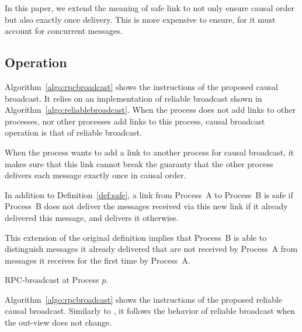 In this paper, we extend the meaning of safe link to not only ensure causal
order but also exactly once delivery. This is more expensive to ensure, for it
must account for concurrent messages. 



\subsection{Operation}

Algorithm~\ref{algo:rpcbroadcast} shows the instructions of the proposed causal
broadcast. It relies on an implementation of reliable broadcast shown in
Algorithm~\ref{algo:reliablebroadcast}. When the process does not add links to
other processes, nor other processes add links to this process, causal broadcast
operation is that of reliable broadcast.

When the process wants to add a link to another process for causal broadcast, it
makes sure that this link cannot break the guaranty that the other process
delivers each message exactly once in causal order.


\begin{definition}
  In addition to Definition~\ref{def:safe}, a link from Process~A to Process~B
  is safe if Process~B does not deliver the messages received via this new link
  if it already delivered this message, and delivers it otherwise.
\end{definition}

This extension of the original definition implies that Process~B is able to
distinguish messages it already delivered that are not received by Process~A
from messages it receives for the first time by Process~A.

\begin{algorithm}[h]
  
  \caption{\label{algo:rpcbroadcast}RPC-broadcast at Process $p$.}
\end{algorithm}

Algorithm~\ref{algo:rpcbroadcast} shows the instructions of the proposed
reliable causal broadcast. Similarly to \PCBROADCAST, it follows the behavior of
reliable broadcast when the out-view does not change. 

